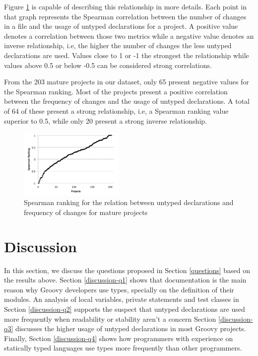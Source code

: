 \documentclass[preprint]{sigplanconf}
\begin{document}
Figure \ref{fig:change_spearman} is capable of describing this relationship in more details.
Each point in that graph represents the Spearman correlation between the number of changes in a file and the usage of untyped declarations for a project. 
A positive value denotes a correlation between those two metrics while a negative value denotes an inverse relationship, i.e, the higher the number of changes the less untyped declarations are used.
Values close to 1 or -1 the strongest the relationship while values above 0.5 or below -0.5 can be considered strong correlations.

From the 203 mature projects in our dataset, only 65 present negative values for the Spearman ranking. 
Most of the projects present a positive correlation between the frequency of changes and the usage of untyped declarations.
A total of 64 of these present a strong relationship, i.e, a Spearman ranking value superior to 0.5, while only 20 present a strong inverse relationship.

\begin{figure}[hb]
\centering \includegraphics[width=0.45\textwidth]{change_spearman} 
\caption{Spearman ranking for the relation between untyped declarations and frequency of changes for mature projects}
\label{fig:change_spearman} 
\end{figure}


















%
%
\section{Discussion\label{discussion}}

In this section, we discuss the questions proposed in Section \ref{questions} based on the results above.
Section \ref{discussion-q1} shows that documentation is the main reason why Groovy developers use types, specially on the definition of their modules.
An analysis of local variables, private statements and test classes in Section \ref{discussion-q2} supports the suspect that untyped declarations are used more frequently when readability or stability aren't a concern
Section \ref{discussion-q3} discusses the higher usage of untyped declarations in most Groovy projects.
Finally, Section \ref{discussion-q4} shows how programmers with experience on statically typed languages use types more frequently than other programmers.
\end{document}
